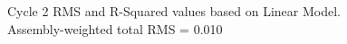 \begin{figure}[htbp]
{\begin{tikzpicture}[x=1in,y=1in]
      \end{tikzpicture}
    }
    


    \caption{Cycle 2 RMS and R-Squared values based on Linear Model. Assembly-weighted total RMS = 0.010 \label{fig:lm_eighth_map_cyc2}}
\end{figure}

